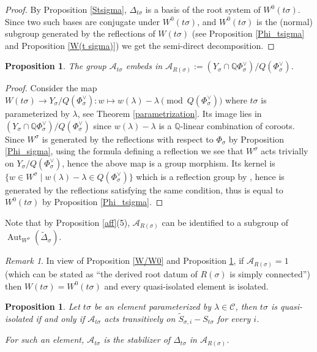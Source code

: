 \documentclass{amsart}
\newtheorem{proposition}[equation]{Proposition}
\numberwithin{equation}{section}
\theoremstyle{definition}
\theoremstyle{remark}
\newtheorem{remark}[equation]{Remark}
\newcommand\BQ{{\mathbb Q}}
\newcommand\CA{{\mathcal A}}
\newcommand\CC{{\mathcal C}}
\DeclareMathOperator\Aut{\mathrm{Aut}}
\begin{document}
\begin{proof}
By  Proposition \ref{Stsigma},  $\Delta_{t\sigma}$ is  a basis  of the root
system of $W^0(t\sigma)$. Since
two  such bases are  conjugate under $W^0(t\sigma)$, and $W^0(t\sigma)$ is the
(normal)  subgroup  generated  by  the  reflections  of  $W(t\sigma)$  (see
Proposition  \ref{Phi_tsigma} and Proposition \ref{W(t  sigma)}) we get the
semi-direct decomposition.
\end{proof}
\begin{proposition}\label{Y'_sigma embeds}
The group $\CA_{t\sigma}$ embeds in
$\CA_{R(\sigma)}:=(Y_\sigma\cap\BQ\Phi_\sigma^\vee)/Q(\Phi_\sigma^\vee)$.
\index{ARs@$\CA_{R(\sigma)}$}
\end{proposition}
\begin{proof} 
Consider the map $W(t\sigma)\to Y_\sigma/Q(\Phi_\sigma^\vee):
w\mapsto w(\lambda)-\lambda \pmod{Q(\Phi_\sigma^\vee)}$ where $t\sigma$
is parameterized by $\lambda$, see Theorem \ref{parametrization}. Its image lies in
$(Y_\sigma\cap\BQ\Phi_\sigma^\vee)/Q(\Phi_\sigma^\vee)$ since $w(\lambda)-\lambda$ is a 
$\BQ$-linear combination of coroots.
Since   $W^\sigma$  is  generated  by  the  reflections  with  respect  to
$\Phi_\sigma$  by Proposition \ref{Phi_sigma}, using the formula defining a
reflection we see that $W^\sigma$ acts trivially on $Y_\sigma/Q(\Phi_\sigma^\vee)$,
hence the above map is a group morphism.
Its kernel is
$\{w\in W^\sigma\mid w(\lambda)-\lambda\in Q(\Phi_\sigma^\vee)\}$ which is a 
reflection group by \cite[Ch.\ VI ex.\ 1 of \S 2]{Bou}, hence is 
generated by the reflections satisfying the same condition, thus 
is equal to $W^0(t\sigma)$ by Proposition \ref{Phi_tsigma}.
\end{proof}
Note that by Proposition \ref{aff}(5), $\CA_{R(\sigma)}$ can be identified to a subgroup
of $\Aut_{W^\sigma}(\tilde\Delta_\sigma)$.
\begin{remark} \label{R(sigma) simply connected}
In  view of Proposition  \ref{W/W0} and  Proposition \ref{Y'_sigma embeds},  if $\CA_{R(\sigma)}=1$
(which  can be stated as ``the derived  root datum of $R(\sigma)$ is simply
connected'')   then $W(t\sigma)=W^0(t\sigma)$  and
every   quasi-isolated   element   is  isolated.
\end{remark}
\begin{proposition} \label{car qisole}
Let $t\sigma$ be an element parameterized by 
$\lambda\in\CC$, then $t\sigma$ is quasi-isolated if and only if 
$\CA_{t\sigma}$ acts transitively on $\tilde S_{\sigma,i}-S_{t\sigma}$ 
for every $i$. 

For such an element, $\CA_{t\sigma}$ is the stabilizer of 
$\Delta_{t\sigma}$ in $\CA_{R(\sigma)}$.
\end{proposition}
\end{document}
